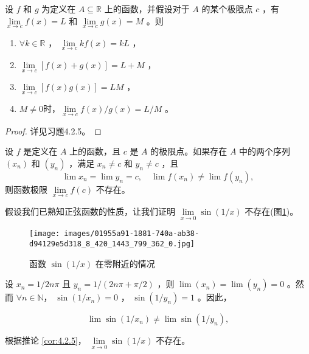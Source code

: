 \begin{Cor}[函数极限的代数极限定理]
  \label{cor:4.2.4}
  设 \(f\) 和 \(g\) 为定义在 \(A \subseteq  \mathbb{R}\) 上的函数，并假设对于 \(A\) 的某个极限点 \(c\) ，有 \(\mathop{\lim }\limits_{{x \rightarrow  c}}f\left( x\right)  = L\) 和 \(\mathop{\lim }\limits_{{x \rightarrow  c}}g\left( x\right)  = M\) 。则
\begin{enumerate}
\item  \(\forall k \in  \mathbb{R}\) ， \(\mathop{\lim }\limits_{{x \rightarrow  c}}{kf}\left( x\right)  = {kL}\) ，
\item  \(\mathop{\lim }\limits_{{x \rightarrow  c}}\left\lbrack  {f\left( x\right)  + g\left( x\right) }\right\rbrack   = L + M\) ，
\item  \(\mathop{\lim }\limits_{{x \rightarrow  c}}\left\lbrack  {f\left( x\right) g\left( x\right) }\right\rbrack   = {LM}\) ，
\item $M\ne 0$时，\(\mathop{\lim }\limits_{{x \rightarrow  c}}f\left( x\right) /g\left( x\right)  = L/M\) 。
\end{enumerate}
\end{Cor}

\begin{proof}
  详见习题4.2.5。
\end{proof}


\begin{Cor}
  \label{cor:4.2.5}
  设 \(f\) 是定义在 \(A\) 上的函数，且 \(c\) 是 \(A\) 的极限点。如果存在 \(A\) 中的两个序列 \(\left( {x}_{n}\right)\) 和 \(\left( {y}_{n}\right)\) ，满足 \({x}_{n} \neq  c\) 和 \({y}_{n} \neq  c\) ，且
\[
\lim {x}_{n} = \lim {y}_{n} = c, \quad\lim f\left( {x}_{n}\right)  \neq  \lim f\left( {y}_{n}\right) ,
\]
则函数极限 \(\mathop{\lim }\limits_{{x \rightarrow  c}}f\left( c\right)\) 不存在。
\end{Cor}


\begin{Eg}
  \label{eg:4.2.6}
  假设我们已熟知正弦函数的性质，让我们证明 \(\mathop{\lim }\limits_{{x \rightarrow  0}}\sin \left( {1/x}\right)\) 不存在(图\ref{fig:4.5})。

\begin{figure}[h]
  \centering
  \texttt{[image: images/01955a91-1881-740a-ab38-d94129e5d318\_8\_420\_1443\_799\_362\_0.jpg]}
  \caption{函数 \(\sin \left( {1/x}\right)\) 在零附近的情况}\label{fig:4.5}
\end{figure}

设 \({x}_{n} = 1/{2n\pi }\) 且 \({y}_{n} = 1/\left( {{2n\pi } + \pi /2}\right)\) ，则 \(\lim \left( {x}_{n}\right)  = \lim \left( {y}_{n}\right)  = 0\) 。然而 $\forall n\in \mathbb{N}$， \(\sin \left( {1/{x}_{n}}\right)  = 0\) ， \(\sin \left( {1/{y}_{n}}\right)  = 1\) 。因此，

\[
\lim \sin \left( {1/{x}_{n}}\right)  \neq  \lim \sin \left( {1/{y}_{n}}\right) ,
\]

根据推论 \ref{cor:4.2.5}， \(\mathop{\lim }\limits_{{x \rightarrow  0}}\sin \left( {1/x}\right)\) 不存在。
\end{Eg}



